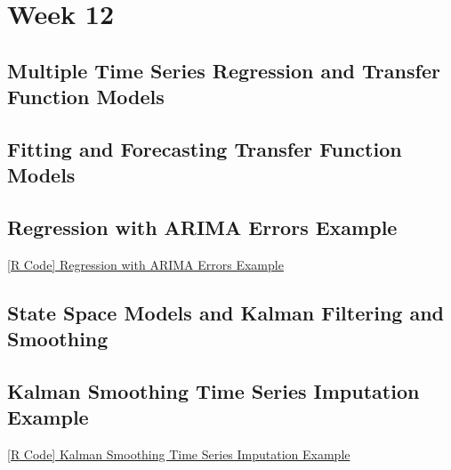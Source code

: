 \chapter{Week 12}
\section{Multiple Time Series Regression and Transfer Function Models}

\section{Fitting and Forecasting Transfer Function Models}

\section{Regression with ARIMA Errors Example}
\href{https://github.com/Hextical/university-notes/blob/master/year-3/semester-2/STAT%20443/code/12.3%20-%20Regression%20with%20ARIMA%20Errors%20Example.R}{[R Code] Regression with ARIMA Errors Example}

\section{State Space Models and Kalman Filtering and Smoothing}

\section{Kalman Smoothing Time Series Imputation Example}
\href{https://github.com/Hextical/university-notes/blob/master/year-3/semester-2/STAT%20443/code/12.5%20-%20Kalman%20Smoothing%20Time%20Series%20Imputation%20Example.R}{[R Code] Kalman Smoothing Time Series Imputation Example}
